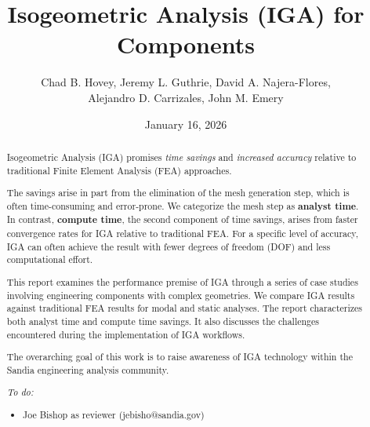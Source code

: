 \documentclass[12pt,report,justified]{SANDreport}
\title{Isogeometric Analysis (IGA) for Components}
\author{Chad B. Hovey, Jeremy L. Guthrie, David A. Najera-Flores, \\ Alejandro D. Carrizales, John M. Emery}
\date{January 16, 2026}
\begin{document}
    \maketitle

%
\begin{abstract}
Isogeometric Analysis (IGA) promises {\em time savings} and {\em increased accuracy} relative to traditional Finite Element Analysis (FEA) approaches.  

The savings arise in part from the elimination of the mesh generation step, which is often time-consuming and error-prone.  We categorize the mesh step as {\bf analyst time}.   In contrast, {\bf compute time}, the second component of time savings, arises from faster convergence rates for IGA relative to traditional FEA.  For a specific level of accuracy, IGA can often achieve the result with fewer degrees of freedom (DOF) and less computational effort.

This report examines the performance premise of IGA through a series of case studies involving engineering components with complex geometries.  We compare IGA results against traditional FEA results for modal and static analyses.  The report characterizes both analyst time and compute time savings.  It also discusses the challenges encountered during the implementation of IGA workflows.

The overarching goal of this work is to raise awareness of IGA technology within the Sandia engineering analysis community.

{\em
To do:
\begin{itemize}
\item Joe Bishop as reviewer (jebisho@sandia.gov)
\end{itemize}
}
\end{abstract}

%
\tableofcontents
\listoffigures
\listoftables


%
\SANDmain		%

\end{document}
